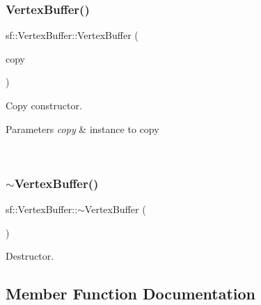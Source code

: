 \subsubsection{\texorpdfstring{VertexBuffer()}{VertexBuffer()}\hspace{0.1cm}{\footnotesize\ttfamily [5/5]}}
{\footnotesize\ttfamily sf\+::\+Vertex\+Buffer\+::\+Vertex\+Buffer (\begin{DoxyParamCaption}\item[{const \mbox{\hyperlink{classsf_1_1_vertex_buffer}{Vertex\+Buffer}} \&}]{copy }\end{DoxyParamCaption})}



Copy constructor. 


\begin{DoxyParams}{Parameters}
{\em copy} & instance to copy \begin{DoxyVerb}\end{DoxyVerb}
 \\
\hline
\end{DoxyParams}
\mbox{\label{classsf_1_1_vertex_buffer_acfbb3b16221bfb9406fcaa18cfcac3e7}} 
\subsubsection{\texorpdfstring{$\sim$VertexBuffer()}{~VertexBuffer()}}
{\footnotesize\ttfamily sf\+::\+Vertex\+Buffer\+::$\sim$\+Vertex\+Buffer (\begin{DoxyParamCaption}{ }\end{DoxyParamCaption})}



Destructor. 

\begin{DoxyVerb}\end{DoxyVerb}
 

\subsection{Member Function Documentation}
\mbox{\label{classsf_1_1_vertex_buffer_a1c623e9701b43125e4b3661bc0d0b65b}} 
